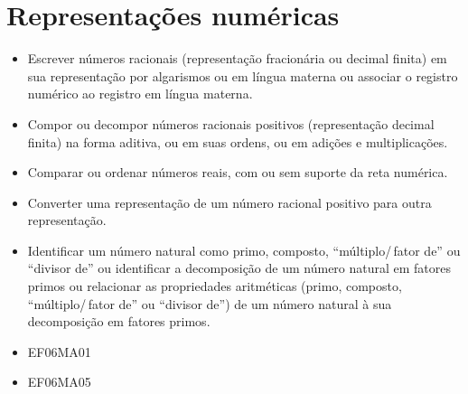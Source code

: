 
\chapter{Representações numéricas}


\begin{itemize}
\item
  Escrever números racionais (representação fracionária ou decimal
  finita) em sua representação por algarismos ou em língua materna ou
  associar o registro numérico ao registro em língua materna.
\item
  Compor ou decompor números racionais positivos (representação decimal
  finita) na forma aditiva, ou em suas ordens, ou em adições e
  multiplicações.
\item
  Comparar ou ordenar números reais, com ou sem suporte da reta
  numérica.
\item
  Converter uma representação de um número racional positivo para outra
  representação. 
  \item Identificar um número natural como primo, composto,
  ``múltiplo/\,fator de'' ou ``divisor de'' ou identificar a decomposição
  de um número natural em fatores primos ou relacionar as propriedades
  aritméticas (primo, composto, ``múltiplo/\,fator de'' ou ``divisor de'')
  de um número natural à sua decomposição em fatores primos.
\end{itemize}

\begin{itemize} 
\item EF06MA01
\item EF06MA05
\end{itemize}

